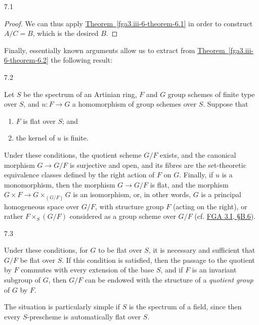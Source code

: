 \begin{proposition}{7.1}
\begin{proof}
      We can thus apply \hyperref[fga3.iii-6-theorem-6.1]{Theorem~\ref*{fga3.iii-6-theorem-6.1}} in order to construct \(A/C=B\), which is the desired \(B\).\end{proof}\end{proposition}\par{}Finally, essentially known arguments allow us to extract from \hyperref[fga3.iii-6-theorem-6.2]{Theorem~\ref*{fga3.iii-6-theorem-6.2}} the following result:\begin{theorem}{7.2}\label{fga3.iii-7-theorem-7.2}\skipsinglepar\par{}Let \(S\) be the spectrum of an Artinian ring, \(F\) and \(G\) group schemes of finite type over \(S\), and \(u\colon  F\to  G\) a homomorphism of group schemes over \(S\).
    Suppose that

    
 \begin{enumerate}
      
 \item[i.]
        \(F\) is flat over \(S\); and
      

      
 \item[ii.]
        the kernel of \(u\) is finite.
      

    \end{enumerate}


    Under these conditions, the quotient scheme \(G/F\) exists, and the canonical morphism \(G\to  G/F\) is surjective and open, and its fibres are the set-theoretic equivalence classes defined by the right action of \(F\) on \(G\).
    Finally, if \(u\) is a monomorphism, then the morphism \(G\to  G/F\) is flat, and the morphism \(G\times  F\to  G\times _{(G/F)}G\) is an isomorphism, or, in other words, \(G\) is a principal homogeneous space over \(G/F\), with structure group \(F\) (acting on the right), or rather \(F\times _S(G/F)\) considered as a group scheme over \(G/F\) (cf. \hyperref[fga3.i-b.6]{FGA 3.I, §B.6}).\end{theorem}\begin{corollary}{7.3}\label{fga3.iii-7-corollary-7.3}\skipsinglepar\par{}Under these conditions, for \(G\) to be flat over \(S\), it is necessary and sufficient that \(G/F\) be flat over \(S\).
    If this condition is satisfied, then the passage to the quotient by \(F\) commutes with every extension of the base \(S\), and if \(F\) is an invariant subgroup of \(G\), then \(G/F\) can be endowed with the structure of a \emph{quotient group} of \(G\) by \(F\).\end{corollary}\par{}The situation is particularly simple if \(S\) is the spectrum of a field, since then every \(S\)-prescheme is automatically flat over \(S\).
